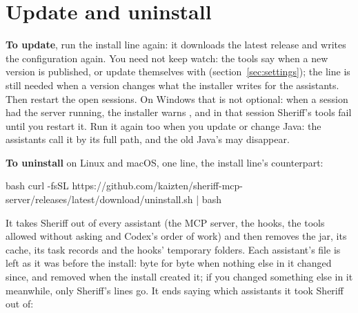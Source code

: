 \documentclass[11pt,a4paper]{article}
\begin{document}



\section{Update and uninstall}
\label{sec:uninstall}

\textbf{To update}, run the install line again: it downloads the latest release
and writes the configuration again. You need not keep watch: the tools say
when a new version is published, or update themselves with
 (section~\ref{sec:settings}); the line is still
needed when a version changes what the installer writes for the assistants. Then restart the open sessions. On
Windows that is not optional: when a session had the server running, the
installer warns , and in that session Sheriff's tools fail until you restart it. Run it
again too when you update or change Java: the assistants call it by its full
path, and the old Java's may disappear.

\textbf{To uninstall} on Linux and macOS, one line, the install line's
counterpart:

\begin{command}{bash}
curl -fsSL https://github.com/kaizten/sheriff-mcp-server/releases/latest/download/uninstall.sh | bash
\end{command}

It takes Sheriff out of every assistant (the MCP server, the hooks, the tools
allowed without asking and Codex's order of work) and then removes the jar,
its cache, its task records and the hooks' temporary folders. Each assistant's
file is left as it was before the install: byte for byte when nothing else in
it changed since, and removed when the install created it; if you changed
something else in it meanwhile, only Sheriff's lines go. It ends saying which
assistants it took Sheriff out of:
\end{document}
